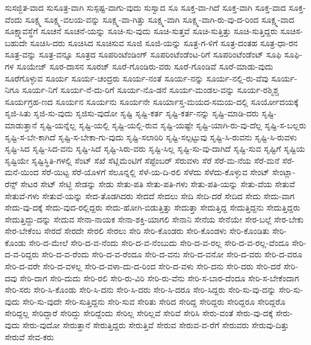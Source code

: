 {ಸುಸಜ್ಜಿತ-ವಾದ
ಸುಸೂತ್ರ-ವಾಗಿ
ಸುಸ್ಪಷ್ಟ-ವಾಗು-ವುದು
ಸುಸ್ವಾದ
ಸೂ
ಸೂಕ್ತ-ವಾ-ಗಿದೆ
ಸೂಕ್ತ-ವಾಗಿ
ಸೂಕ್ತ-ವಾದ
ಸೂಕ್ತ-ವೆಂದು
ಸೂಕ್ಷ್ಮ
ಸೂಕ್ಷ್ಮ-ವಲಯ-ವನ್ನು
ಸೂಕ್ಷ್ಮ-ವಾ-ಗಿತ್ತು
ಸೂಕ್ಷ್ಮ-ವಾಗಿ
ಸೂಕ್ಷ್ಮ-ವಾಗಿ-ರು-ವು-ದ-ರಿಂದ
ಸೂಕ್ಷ್ಮ-ವಾದ
ಸೂಕ್ಷ್ಮಾವಸ್ಥೆಗೆ
ಸೂಚನೆ
ಸೂಚನೆ-ಯನ್ನು
ಸೂಚಿ-ಸು-ವುದು
ಸೂಚಿ-ಸುತ್ತವೆ
ಸೂಚಿ-ಸುತ್ತಿತ್ತು
ಸೂಚಿ-ಸುತ್ತಿದ್ದರು
ಸೂಚಿಸ-ಬಹುದೇ
ಸೂಚಿಸಿ-ದರು
ಸೂಚಿಸಿದ
ಸೂಚಿಸುವ
ಸೂಜಿ
ಸೂಜಿ-ಯನ್ನು
ಸೂತ್ರ-ಗ-ಳಿಗೆ
ಸೂತ್ರ-ದಂತಹ
ಸೂತ್ರ-ಧಾ-ರನ
ಸೂತ್ರ-ವನ್ನು
ಸೂತ್ರ-ವನ್ನೂ
ಸೂತ್ರದ
ಸೂಪರಿಂಟೆಂಡಿಂಗ್
ಸೂಪರಿಂಟೆಂಡೆಂಟ-ರಿಗೆ
ಸೂಪರಿಂಟೆಂಡೆಂಟ್
ಸೂಫಿ
ಸೂಫಿ-ಗಳ
ಸೂಯೇಜ್
ಸೂರ-ದಾಸನ
ಸೂರಜ್
ಸೂರೆ-ಗೊಂಡಿರು-ವರು
ಸೂರೆ-ಗೊಂಡಿವೆ
ಸೂರೆ-ಮಾಡು-ವುದು
ಸೂರೆಗೊಳ್ಳುವ
ಸೂರ್ಯ
ಸೂರ್ಯ-ಚಂದ್ರರು
ಸೂರ್ಯ-ನಂತೆ
ಸೂರ್ಯ-ನನ್ನು
ಸೂರ್ಯ-ನಲ್ಲಿ-ರು-ವೆವು
ಸೂರ್ಯ-ನಿಗೂ
ಸೂರ್ಯ-ನಿಗೆ
ಸೂರ್ಯ-ನೆ-ದು-ರಿಗೆ
ಸೂರ್ಯ-ನೊ-ಡನೆ
ಸೂರ್ಯ-ಮಂಡಲ-ವನ್ನು
ಸೂರ್ಯ-ರಶ್ಮಿಶ್ಚ
ಸೂರ್ಯಗ್ರಹ-ಣದ
ಸೂರ್ಯನ
ಸೂರ್ಯನು
ಸೂರ್ಯನೇ
ಸೂರ್ಯಾಸ್ತ-ಮಯದ-ಸಮಯ-ದಲ್ಲಿ
ಸೂರ್ಯೋದಯಕ್ಕೆ
ಸೃಜಿ-ಸಿತು
ಸೃಜಿ-ಸು-ವುದು
ಸೃಜಿಸು-ವುದೋ
ಸೃಷ್ಟಿ
ಸೃಷ್ಟಿ-ಕರ್ತ
ಸೃಷ್ಟಿ-ಕರ್ತ-ನನ್ನು
ಸೃಷ್ಟಿ-ಮಾಡಿ-ದರು
ಸೃಷ್ಟಿ-ಮಾಡುತ್ತಾನೆ
ಸೃಷ್ಟಿ-ಯನ್ನೆಲ್ಲ
ಸೃಷ್ಟಿ-ಯಲ್ಲಿ
ಸೃಷ್ಟಿ-ಯಲ್ಲಿ-ರುವ
ಸೃಷ್ಟಿ-ಯಷ್ಟೇ
ಸೃಷ್ಟಿ-ಯಾಗಿ-ರು-ವು-ದೆಲ್ಲ
ಸೃಷ್ಟಿ-ಸ-ಬಲ್ಲರು
ಸೃಷ್ಟಿ-ಸ-ಬೇ-ಕಾಗಿದೆ
ಸೃಷ್ಟಿ-ಸ-ಬೇಕಾ-ಗು-ವುದು
ಸೃಷ್ಟಿ-ಸಲಾರಿರಿ
ಸೃಷ್ಟಿ-ಸಲ್ಪಟ್ಟುವು
ಸೃಷ್ಟಿ-ಸಿ-ರುವನು
ಸೃಷ್ಟಿ-ಸಿ-ರುವಳು
ಸೃಷ್ಟಿ-ಸಿದ
ಸೃಷ್ಟಿ-ಸಿದ-ವನು
ಸೃಷ್ಟಿ-ಸಿದೆ
ಸೃಷ್ಟಿ-ಸಿರು-ವರು
ಸೃಷ್ಟಿ-ಸಿಲ್ಲ
ಸೃಷ್ಟಿ-ಸು-ವು-ದಾಗಿದೆ
ಸೃಷ್ಟಿ-ಸುವ
ಸೃಷ್ಟಿಗೆ
ಸೃಷ್ಟಿಯ
ಸೃಷ್ಟಿಯೇ
ಸೃಷ್ಟಿಸ್ಥಿತಿ-ಗಳಲ್ಲಿ
ಸೆಂಟ್
ಸೆಖೆ
ಸೆಟ್ಲಿಮೆಂಟಿಗೆ
ಸೆಪ್ಟೆಂಬರ್
ಸೆರುವಳು
ಸೆರೆ
ಸೆರೆ-ಮ-ನೆಯ
ಸೆರೆ-ಮನೆ
ಸೆರೆ-ಮನೆ-ಯಿಂದ
ಸೆರೆ-ಯಿಟ್ಟ
ಸೆರೆ-ಯೊಳಗೆ
ಸೆಲೂನ್ನಲ್ಲಿ
ಸೆಳೆ-ಯ-ದಿ-ರಲಿ
ಸೆಳೆದು
ಸೆಳೆದು-ಕೊಳ್ಳುವ
ಸೇಂಟ್
ಸೇಂಟ್ಲಾ-ರೆನ್ಸ್
ಸೇಟರ
ಸೇಟ್
ಸೇಟ್ಜಿ
ಸೇಡನ್ನು
ಸೇಡು
ಸೇತು-ಪತಿ
ಸೇತು-ಪತಿ-ಗಳು
ಸೇತು-ಪತಿ-ಯನ್ನು
ಸೇತು-ವೆಯ
ಸೇತುವೆ
ಸೇತುವೆ-ಗಳು
ಸೇತುವೆ-ಯನ್ನು
ಸೇದ-ತೊಡಗಿದರು
ಸೇದದೆ
ಸೇದಲು
ಸೇದಿ
ಸೇದಿ-ದರೆ
ಸೇದಿದ
ಸೇದು
ಸೇದು-ವಾಗ
ಸೇದು-ವು-ದಕ್ಕೆ
ಸೇದು-ವುದ-ರಲ್ಲಿದ್ದರು
ಸೇದು-ಹೋಗಿ-ಬಿಡುತ್ತಿತ್ತು
ಸೇದುತ್ತಾ
ಸೇದುತ್ತಿದ್ದ
ಸೇದುತ್ತಿದ್ದನು
ಸೇದುತ್ತಿದ್ದರು
ಸೇದುತ್ತಿದ್ದು-ದನ್ನು
ಸೇದುವ
ಸೇನಾ-ನಾಯಕ
ಸೇನಾ-ಶಕ್ತಿ-ಯಾಗಲಿ
ಸೇನಾನಿ
ಸೇನೆಯ
ಸೇನೆಯೇ
ಸೇರ-ಬಲ್ಲೆ
ಸೇರ-ಬೇಕು
ಸೇರ-ಬೇಕೆಂಬ
ಸೇರದೆ
ಸೇರದೇ
ಸೇರಲಿ
ಸೇರಲು
ಸೇರಿ
ಸೇರಿ-ಕೊಂಡರು
ಸೇರಿ-ಕೊಂಡಳು
ಸೇರಿ-ಕೊಂಡಿತು
ಸೇರಿ-ಕೊಂಡು
ಸೇರಿ-ದ-ಮೇಲೆ
ಸೇರಿ-ದ-ವ-ನೆಂದು
ಸೇರಿ-ದ-ವ-ನೆಂಬುದು
ಸೇರಿ-ದ-ವ-ರಲ್ಲ
ಸೇರಿ-ದ-ವ-ರಲ್ಲ-ವೆಂದೂ
ಸೇರಿ-ದ-ವ-ರಿದ್ದರು
ಸೇರಿ-ದ-ವ-ರೆಂದು
ಸೇರಿ-ದ-ವ-ರೆಂದೂ
ಸೇರಿ-ದ-ವನು
ಸೇರಿ-ದ-ವನೋ
ಸೇರಿ-ದ-ವರು
ಸೇರಿ-ದ-ವರೂ
ಸೇರಿ-ದ-ವರೇ
ಸೇರಿ-ದ-ವಳಲ್ಲ
ಸೇರಿ-ದ-ವಳಾ-ದು-ದ-ರಿಂದ
ಸೇರಿ-ದ-ವಳು
ಸೇರಿ-ದನು
ಸೇರಿ-ದರು
ಸೇರಿ-ದರೆ
ಸೇರಿ-ದವು
ಸೇರಿ-ದಾಗ
ಸೇರಿ-ದುದು
ಸೇರಿ-ರಲಿ
ಸೇರಿ-ರು-ವಿರಿ
ಸೇರಿ-ರು-ವೆನು
ಸೇರಿ-ಸ-ಬಾರ-ದೆಂದೂ
ಸೇರಿ-ಸ-ಬೇಕೆಂದಾಗ
ಸೇರಿ-ಸರು
ಸೇರಿ-ಸಿ-ಕೊಂಡು
ಸೇರಿ-ಸಿ-ದನು
ಸೇರಿ-ಸಿ-ದರು
ಸೇರಿ-ಸಿ-ದರೂ
ಸೇರಿ-ಸಿದ್ದರು
ಸೇರಿ-ಸು-ವು-ದನ್ನು
ಸೇರಿ-ಸು-ವುದು
ಸೇರಿ-ಸು-ವುದೇ
ಸೇರಿ-ಸುತ್ತಿದ್ದನು
ಸೇರಿ-ಸುವ
ಸೇರಿತು
ಸೇರಿದ
ಸೇರಿದ್ದ
ಸೇರಿದ್ದರು
ಸೇರಿದ್ದರೂ
ಸೇರಿದ್ದರೊ
ಸೇರಿದ್ದಲ್ಲ
ಸೇರಿದ್ದಾರೆ
ಸೇರಿದ್ದು
ಸೇರಿದ್ದೆಂದು
ಸೇರಿಲ್ಲ
ಸೇರಿಲ್ಲವೆ
ಸೇರಿವೆ
ಸೇರಿಸಿ
ಸೇರು-ವಂತೆ
ಸೇರು-ವು-ದಕ್ಕೆ
ಸೇರು-ವುದು
ಸೇರು-ವುದೋ
ಸೇರುತ್ತಾನೆ
ಸೇರುತ್ತಿದ್ದರು
ಸೇರುತ್ತಿವೆ
ಸೇರುವ
ಸೇರುವ-ವ-ರೆಗೆ
ಸೇರುವರು
ಸೇರುವು-ದಿತ್ತು
ಸೇರುವೆ
ಸೇವ-ಕರು
}
